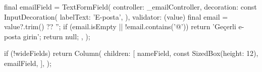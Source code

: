 \documentclass[11pt,a4paper]{article}
\begin{document}
\begin{codeblock}
{{{{{                                  final emailField = TextFormField(
                                    controller: _emailController,
                                    decoration: const InputDecoration(
                                      labelText: 'E-posta',
                                    ),
                                    validator: (value) {
                                      final email = value?.trim() ?? '';
                                      if (email.isEmpty ||
                                          !email.contains('@')) {
                                        return 'Geçerli e-posta girin';
                                      }
                                      return null;
                                    },
                                  );

                                  if (!wideFields) {
                                    return Column(
                                      children: [
                                        nameField,
                                        const SizedBox(height: 12),
                                        emailField,
                                      ],
                                    );
                                  }

}}}}}
\end{codeblock}
\end{document}
